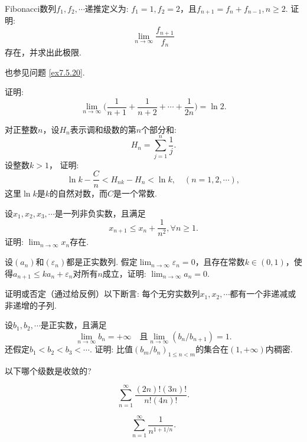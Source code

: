 \begin{example}
  Fibonacci数列$f_1,f_2,\cdots$递推定义为: $f_1=1,f_2=2$，且$f_{n+1}=f_n+f_{n-1},n\ge2$. 证明:
  \[ \lim_{n\to\infty}\frac{f_{n+1}}{f_n} \]
  存在，并求出此极限.
\end{example}
\begin{note}
  也参见问题 \ref{ex7.5.20}.
\end{note}

\begin{example}
  证明:
  \[ \lim_{n\to\infty}\Big(
   \frac1{n+1}+\frac1{n+2}+\cdots+\frac1{2n}  \Big) = \ln2.
 \]
\end{example}

\begin{example}
  对正整数$n$，设$H_n$表示调和级数的第$n$个部分和:
  \[ H_n=\sum_{j=1}^n\frac1j. \]
  设整数$k>1$， 证明:
  \[ \ln k-\frac Cn<H_{nk}-H_n<\ln k,\quad(n=1,2,\cdots) ,\]
  这里$\ln k$是$k$的自然对数，而$C$是一个常数.
\end{example}

\begin{example}
  设$x_1,x_2,x_3,\cdots$是一列非负实数，且满足
  \[ x_{n+1}\le x_n+\frac1{n^2},\forall n\ge1. \]
  证明: $\lim_{n\to\infty}x_n$存在.
\end{example}

\begin{example}
  设$(a_n)$和$(\varepsilon_n)$都是正实数列. 假定$\lim_{n\to\infty}\varepsilon_n=0$，且存在常数$k\in(0,1)$，使得$a_{n+1}\le ka_n+\varepsilon_n$对所有$n$成立，证明: $\lim_{n\to\infty}a_n=0$.
\end{example}

\begin{example}
  证明或否定（通过给反例）以下断言: 每个无穷实数列$x_1,x_2,\cdots$都有一个非递减或非递增的子列.
\end{example}

\begin{example}
  设$b_1,b_2,\cdots$是正实数，且满足
  \[ \lim_{n\to\infty}b_n=+\infty\quad\text{且} \lim_{n\to\infty}(b_n/b_{n+1})=1.  \]
  还假定$b_1<b_2<b_3<\cdots$. 证明: 比值$(b_m/b_n)_{1\le n<m}$的集合在$(1,+\infty)$内稠密.
\end{example}

\begin{example}
  以下哪个级数是收敛的?
  \begin{eenum}
    \item
    \[
      \sum_{n=1}^\infty\frac{(2n)!(3n)!}{n!(4n)!}.
    \]
    \item
    \[
      \sum_{n=1}^\infty\frac1{n^{1+1/n}}.
    \]
  \end{eenum}
\end{example}

